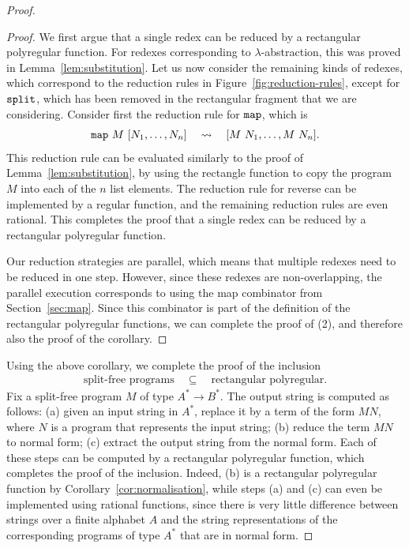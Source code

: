 \begin{proof}
\begin{proof}
        We first argue that a single redex can be reduced by a rectangular polyregular function. For redexes corresponding to $\lambda$-abstraction, this was proved in Lemma~\ref{lem:substitution}. Let us now consider the remaining kinds of redexes, which correspond to the reduction rules in Figure~\ref{fig:reduction-rules}, except for $\mathtt{split}$, which has been removed in the rectangular fragment that we are considering. Consider first the reduction rule for  $\mathtt{map}$, which is 
        \begin{align*}
        \mathtt{map}\  M\  [N_1,\ldots,N_n] 
        \quad \leadsto \quad 
        [M\ N_1, \ldots, M\ N_n].
        \end{align*}
        This reduction rule can be evaluated similarly to the proof of Lemma~\ref{lem:substitution}, by  using the rectangle function to copy the program $M$ into each of the $n$ list elements. The reduction rule for reverse can be implemented by a regular function, and the remaining reduction rules are even rational. 
 This completes the proof that a single redex can be reduced by a rectangular polyregular function.

        Our reduction strategies are parallel, which means that multiple redexes need to be reduced in one step. However, since these redexes are non-overlapping, the parallel execution corresponds to using the map combinator from Section~\ref{sec:map}. Since this combinator is part of the definition of the rectangular polyregular functions, we can complete the proof of (2), and therefore also the proof of the corollary.
    \end{proof}

    Using the above corollary, we complete the proof of the inclusion
        \begin{align*}
    \text{split-free programs} 
    \quad \subseteq \quad 
    \text{rectangular polyregular}.
    \end{align*}
Fix  a split-free program $M$ of type  $A^* \to B^*$. The output string is computed as follows: (a) given an input string in $A^*$, replace it by  a term of the form $M N$, where $N$ is a program that represents the input string; (b) reduce the term $M N$ to normal form; (c) extract the output string from the normal form. Each of these steps can be computed by a rectangular polyregular function, which completes the proof of the inclusion. Indeed, (b) is a rectangular polyregular function by Corollary~\ref{cor:normalisation}, while steps (a) and (c) can even be implemented using rational functions, since  there is very little difference between strings over a finite alphabet $A$ and the string representations of the corresponding programs of type $A^*$ that are in normal form. 
\end{proof}


